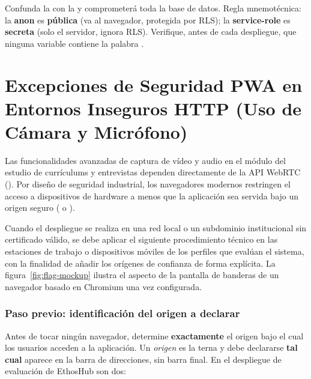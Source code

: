 \begin{AlertaSeguridad}
Confunda la  con la  y comprometerá toda la
base de datos. Regla mnemotécnica: la \textbf{anon} es \textbf{pública} (va al navegador,
protegida por RLS); la \textbf{service-role} es \textbf{secreta} (solo el servidor, ignora
RLS). Verifique, antes de cada despliegue, que ninguna variable  contiene
la palabra .
\end{AlertaSeguridad}

\section[Excepciones PWA en HTTP (Cámara y Micrófono)]{Excepciones de Seguridad PWA en Entornos Inseguros HTTP (Uso de Cámara y Micrófono)}%
\label{sec:pwa-http}

Las funcionalidades avanzadas de captura de vídeo y audio en el módulo del estudio de
currículums y entrevistas dependen directamente de la API WebRTC ().
Por diseño de seguridad industrial, los navegadores modernos restringen el acceso a
dispositivos de hardware a menos que la aplicación sea servida bajo un origen seguro
( o ).\par

Cuando el despliegue se realiza en una red local o un subdominio institucional sin
certificado válido, se debe aplicar el siguiente procedimiento técnico en las estaciones
de trabajo o dispositivos móviles de los perfiles que evalúan el sistema, con la finalidad
de añadir los orígenes de confianza de forma explícita. La figura~\ref{fig:flag-mockup}
ilustra el aspecto de la pantalla de banderas de un navegador basado en Chromium una vez
configurada.\par

\subsubsection{Paso previo: identificación del origen a declarar}
Antes de tocar ningún navegador, determine \textbf{exactamente} el origen bajo el cual los
usuarios acceden a la aplicación. Un \textit{origen} es la terna 
y debe declararse \textbf{tal cual} aparece en la barra de direcciones, sin barra final. En
el despliegue de evaluación de EthosHub son dos:\par

